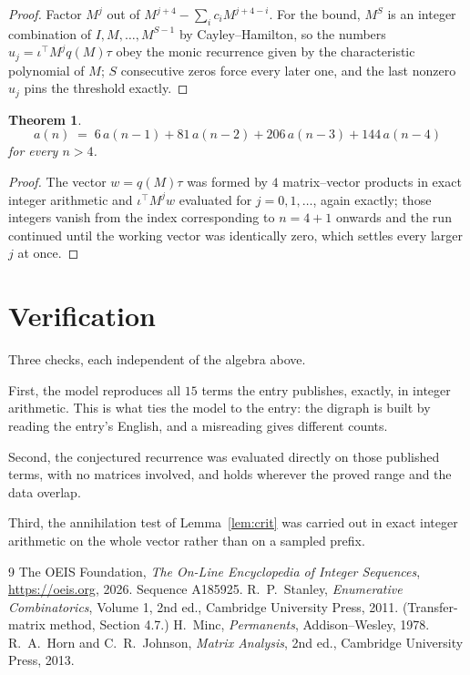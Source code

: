 \documentclass[11pt,a4paper]{article}
\theoremstyle{plain}
\newtheorem{theorem}{Theorem}
\theoremstyle{definition}
\begin{document}
\begin{proof}
Factor $M^{j}$ out of $M^{j+4}-\sum_ic_iM^{j+4-i}$. For the bound, $M^{S}$
is an integer combination of $I,M,\dots,M^{S-1}$ by Cayley--Hamilton, so the numbers
$u_j=\iota^{\!\top}M^{j}q(M)\tau$ obey the monic recurrence given by the characteristic
polynomial of $M$; $S$ consecutive zeros force every later one, and the last nonzero $u_j$
pins the threshold exactly.
\end{proof}

\begin{theorem}
\[
a(n)\;=\;6\,a(n-1) + 81\,a(n-2) + 206\,a(n-3) + 144\,a(n-4)
\]
for every $n>4$.
\end{theorem}

\begin{proof}
The vector $w=q(M)\tau$ was formed by $4$ matrix--vector products in exact integer
arithmetic and $\iota^{\!\top}M^{j}w$ evaluated for $j=0,1,\dots$, again exactly; those
integers vanish from the index corresponding to $n=4+1$ onwards and the run continued
until the working vector was identically zero, which settles every larger $j$ at once.
\end{proof}

\section{Verification}

Three checks, each independent of the algebra above.

First, the model reproduces all $15$ terms the entry publishes, exactly, in integer
arithmetic. This is what ties the model to the entry: the digraph is built by reading the
entry's English, and a misreading gives different counts.

Second, the conjectured recurrence was evaluated directly on those published terms, with no
matrices involved, and holds wherever the proved range and the data overlap.

Third, the annihilation test of Lemma~\ref{lem:crit} was carried out in exact integer
arithmetic on the whole vector rather than on a sampled prefix.

\begin{thebibliography}{9}
 The OEIS Foundation, \emph{The On-Line Encyclopedia of Integer
Sequences}, \url{https://oeis.org}, 2026. Sequence A185925.
 R.~P.~Stanley, \emph{Enumerative Combinatorics}, Volume 1, 2nd ed.,
Cambridge University Press, 2011. (Transfer-matrix method, Section 4.7.)
 H.~Minc, \emph{Permanents}, Addison--Wesley, 1978.
 R.~A.~Horn and C.~R.~Johnson, \emph{Matrix Analysis}, 2nd ed., Cambridge
University Press, 2013.
\end{thebibliography}
\end{document}
